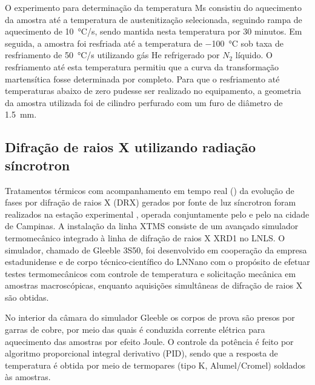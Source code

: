 O experimento para determinação da temperatura Ms consistiu do aquecimento da amostra até a temperatura de austenitização selecionada, seguindo rampa de aquecimento de \SI{10}{\degreeCelsius/s}, sendo mantida nesta temperatura por 30 minutos. Em seguida, a amostra foi resfriada até a temperatura de \SI{-100}{\degreeCelsius} sob taxa de resfriamento de \SI{50}{\degreeCelsius/s} utilizando gás He refrigerado por $N_2$ líquido. O resfriamento até esta temperatura permitiu que a curva da transformação martensítica fosse determinada por completo. Para que o resfriamento até temperaturas abaixo de zero pudesse ser realizado no equipamento, a geometria da amostra utilizada foi de cilindro perfurado com um furo de diâmetro de \SI{1.5}{mm}.

\subsection{Difração de raios X utilizando radiação síncrotron}

Tratamentos térmicos com acompanhamento em tempo real () da evolução de fases por difração de raios X (DRX) gerados por fonte de luz síncrotron foram realizados na estação experimental , operada conjuntamente pelo   e pelo  na cidade de Campinas. A instalação da linha XTMS consiste de um avançado simulador termomecânico integrado à linha de difração de raios X XRD1 no LNLS. O simulador, chamado de Gleeble\textregistered{} 3S50, foi desenvolvido em cooperação da empresa estadunidense  e de corpo técnico-científico do LNNano com o propósito de efetuar testes termomecânicos com controle de temperatura e solicitação mecânica em amostras macroscópicas, enquanto aquisições simultâneas de difração de raios X são obtidas. %


No interior da câmara do simulador Gleeble os corpos de prova são presos por garras de cobre, por meio das quais é conduzida corrente elétrica para aquecimento das amostras por efeito Joule. O controle da potência é feito por algoritmo proporcional integral derivativo (PID), sendo que a resposta de temperatura é obtida por meio de termopares (tipo K, Alumel/Cromel) soldados às amostras.

